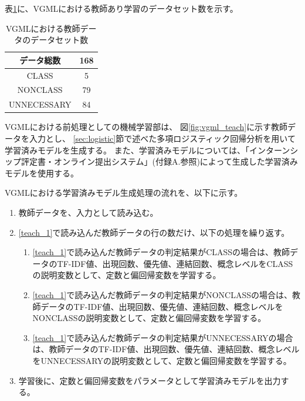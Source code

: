 表\ref{table:vgml_data_set}に、VGMLにおける教師あり学習のデータセット数を示す。

\begin{table}[t]
    \begin{center}
      \caption{VGMLにおける教師データのデータセット数}
      \label{table:vgml_data_set}
      \begin{tabular}{c|c}
        データ総数　& 168\\
        \hline
        \hline
        CLASS    & 5\\ \hline
        NONCLASS & 79\\ \hline
        UNNECESSARY   & 84\\ \hline
      \end{tabular}
    \end{center}
  \end{table}

VGMLにおける前処理としての機械学習部は、
図\ref{fig:vgml_teach}に示す教師データを入力とし、
\ref{sec:logistic}節で述べた多項ロジスティック回帰分析を用いて学習済みモデルを生成する。
また、学習済みモデルについては、「インターンシップ評定書・オンライン提出システム」(付録A.参照)によって生成した学習済みモデルを使用する。

VGMLにおける学習済みモデル生成処理の流れを、以下に示す。

\begin{enumerate}
	\item 教師データを、入力として読み込む。
    \label{teach_1}
	\item \ref{teach_1}で読み込んだ教師データの行の数だけ、以下の処理を繰り返す。
        \begin{enumerate}
            \item \ref{teach_1}で読み込んだ教師データの判定結果がCLASSの場合は、教師データのTF-IDF値、出現回数、優先値、連結回数、概念レベルをCLASSの説明変数として、定数と偏回帰変数を学習する。
            \item \ref{teach_1}で読み込んだ教師データの判定結果がNONCLASSの場合は、教師データのTF-IDF値、出現回数、優先値、連結回数、概念レベルをNONCLASSの説明変数として、定数と偏回帰変数を学習する。
            \item \ref{teach_1}で読み込んだ教師データの判定結果がUNNECESSARYの場合は、教師データのTF-IDF値、出現回数、優先値、連結回数、概念レベルをUNNECESSARYの説明変数として、定数と偏回帰変数を学習する。
        \end{enumerate}
	\item 学習後に、定数と偏回帰変数をパラメータとして学習済みモデルを出力する。
\end{enumerate}

